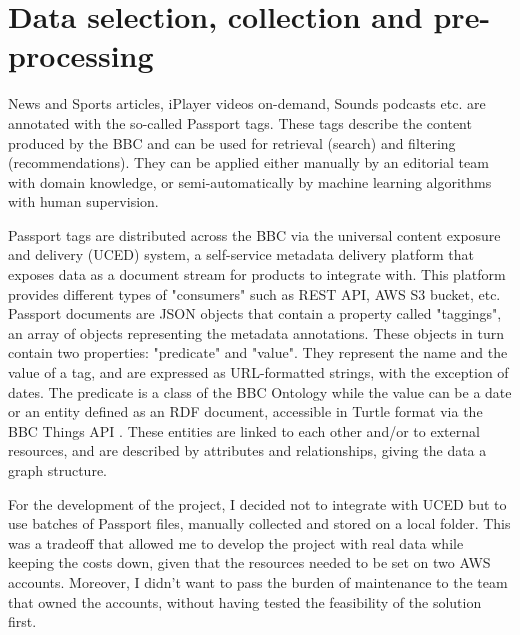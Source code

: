 
\section{Data selection, collection and pre-processing}


News and Sports articles, iPlayer videos on-demand, Sounds podcasts etc. are annotated with the so-called Passport tags.
These tags describe the content produced by the BBC and can be used for retrieval (search) and filtering (recommendations).
They can be applied either manually by an editorial team with domain knowledge,
or semi-automatically by machine learning algorithms with human supervision.

Passport tags are distributed across the BBC via the universal content exposure and delivery (UCED) system,
a self-service metadata delivery platform that exposes data as a document stream for products to integrate with.
This platform provides different types of "consumers" such as REST API, AWS S3 bucket, etc.
Passport documents are JSON objects that contain a property called "taggings", an array of objects representing the
metadata annotations. These objects in turn contain two properties: "predicate" and "value". They represent the name and the value of
a tag, and are expressed as URL-formatted strings, with the exception of dates. The predicate is a class of the BBC Ontology \cite{BBC:Ontologies}
while the value can be a date or an entity defined as an RDF \cite{W3C:RDF,W3C:RDF:Concepts} document,
accessible in Turtle format \cite{W3C:Turtle} via the BBC Things API \cite{BBC:Things,BBC:Things:About,BBC:Things:API}.
These entities are linked to each other and/or to external resources, and are described by attributes and relationships, giving the
data a graph structure.


For the development of the project, I decided not to integrate with UCED but to use batches of Passport files, manually collected and stored
on a local folder.
This was a tradeoff that allowed me to develop the project with real data while keeping the costs down, given that the resources needed to
be set on two AWS accounts. Moreover, I didn't want to pass the burden of maintenance to the team that owned the accounts, without having tested
the feasibility of the solution first.


